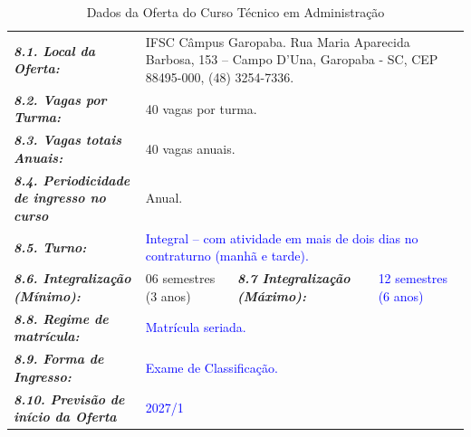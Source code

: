 \documentclass{../../modelos/latex-shared/ifsc-ppc}
\newcommand{\revisao}[1]{\textcolor{blue}{#1}}
\newcommand{\revisao}[1]{#1}
\begin{document}
\begin{table}[H]
\centering
\small
\caption{Dados da Oferta do Curso Técnico em Administração}
\label{qua:dados-oferta}
\vspace{0.2cm}
\begin{tabularx}{\linewidth}{|p{4.4cm}|X|p{3.8cm}|X|}
\hline
\rowcolor{cinzaTabela}
\multicolumn{4}{|l|}{\textcolor{ifscgreen}{\textbf{\large 8. Dados da Oferta:}}} \\ \hline
\textcolor{ifscgreen}{\textbf{\textit{8.1. Local da Oferta:}}} & \multicolumn{3}{p{\dimexpr\linewidth-4.4cm-4\tabcolsep-3\arrayrulewidth\relax}|}{IFSC Câmpus Garopaba. Rua Maria Aparecida Barbosa, 153 -- Campo D'Una, Garopaba - SC, CEP 88495-000, (48) 3254-7336.} \\ \hline
\textcolor{ifscgreen}{\textbf{\textit{8.2. Vagas por Turma:}}} & \multicolumn{3}{p{\dimexpr\linewidth-4.4cm-4\tabcolsep-3\arrayrulewidth\relax}|}{40 vagas por turma.} \\ \hline
\textcolor{ifscgreen}{\textbf{\textit{8.3. Vagas totais Anuais:}}} & \multicolumn{3}{p{\dimexpr\linewidth-4.4cm-4\tabcolsep-3\arrayrulewidth\relax}|}{40 vagas anuais.} \\ \hline
\textcolor{ifscgreen}{\textbf{\textit{8.4. Periodicidade de ingresso no curso}}} & \multicolumn{3}{p{\dimexpr\linewidth-4.4cm-4\tabcolsep-3\arrayrulewidth\relax}|}{Anual.} \\ \hline
\textcolor{ifscgreen}{\textbf{\textit{8.5. Turno:}}} & \multicolumn{3}{p{\dimexpr\linewidth-4.4cm-4\tabcolsep-3\arrayrulewidth\relax}|}{\revisao{Integral -- com atividade em mais de dois dias no contraturno (manhã e tarde).}} \\ \hline
\textcolor{ifscgreen}{\textbf{\textit{8.6. Integralização (Mínimo):}}} & 06 semestres (3 anos) & \textcolor{ifscgreen}{\textbf{\textit{8.7 Integralização (Máximo):}}} & \revisao{12 semestres (6 anos)} \\ \hline
\textcolor{ifscgreen}{\textbf{\textit{8.8. Regime de matrícula:}}} & \multicolumn{3}{p{\dimexpr\linewidth-4.4cm-4\tabcolsep-3\arrayrulewidth\relax}|}{\revisao{Matrícula seriada.}} \\ \hline
\textcolor{ifscgreen}{\textbf{\textit{8.9. Forma de Ingresso:}}} & \multicolumn{3}{p{\dimexpr\linewidth-4.4cm-4\tabcolsep-3\arrayrulewidth\relax}|}{\revisao{Exame de Classificação.}} \\ \hline
\textcolor{ifscgreen}{\textbf{\textit{8.10. Previsão de início da Oferta}}} & \multicolumn{3}{p{\dimexpr\linewidth-4.4cm-4\tabcolsep-3\arrayrulewidth\relax}|}{\revisao{2027/1}} \\ \hline
\end{tabularx}
\end{table}
\end{document}

